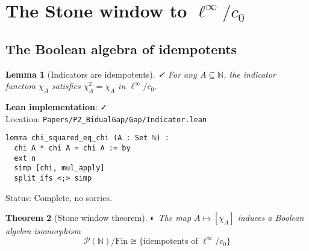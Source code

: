 \documentclass[11pt]{article}
\newtheorem{theorem}{Theorem}[section]
\newtheorem{lemma}[theorem]{Lemma}
\theoremstyle{definition}
\theoremstyle{remark}
\newcommand{\leanok}{\textcolor{green!70!black}{✓}}
\newcommand{\leanpartial}{\textcolor{orange!70!black}{◐}}
\newcommand{\leanloc}[1]{\texttt{\footnotesize\color{blue!60!black}#1}}
\newcommand{\N}{\mathbb{N}}
\newcommand{\cnull}{c_0}
\newcommand{\linf}{\ell^\infty}
\begin{document}
\section{The Stone window to \texorpdfstring{$\ell^\infty/c_0$}{l-infinity/c-0}}\label{sec:stone}

\subsection{The Boolean algebra of idempotents}

\begin{lemma}[Indicators are idempotents]\label{lem:indicator-idem} \leanok
For any \(A\subseteq\N\), the indicator function \(\chi_A\) satisfies \(\chi_A^2=\chi_A\) in \(\linf/\cnull\).
\end{lemma}

\begin{mdframed}[style=okbox]
\textbf{Lean implementation}: \leanok\\
Location: \leanloc{Papers/P2\_BidualGap/Gap/Indicator.lean}\\
\begin{verbatim}
lemma chi_squared_eq_chi (A : Set ℕ) : 
  chi A * chi A = chi A := by
  ext n
  simp [chi, mul_apply]
  split_ifs <;> simp
\end{verbatim}
Status: Complete, no sorries.
\end{mdframed}

\begin{theorem}[Stone window theorem]\label{thm:stone-window} \leanpartial
The map \(A\mapsto[\chi_A]\) induces a Boolean algebra isomorphism
\[
  \mathcal{P}(\N)/\mathrm{Fin} \cong \{\text{idempotents of }\linf/\cnull\}
\]
\end{theorem}
\end{document}
